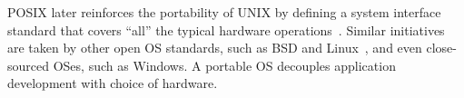 POSIX later
reinforces the portability of UNIX by defining a system interface standard that covers ``all'' the typical hardware operations~\cite{ieee-posix}.
Similar initiatives are taken by other open OS standards, such as BSD and Linux~\cite{quarterman85bsd,linux-standard-base}, and even close-sourced OSes, such as Windows.
A portable OS decouples application development with choice of hardware.



